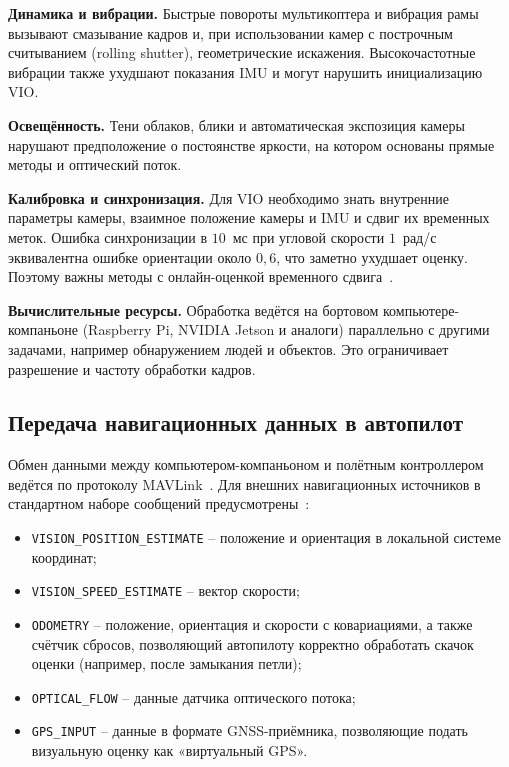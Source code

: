     \textbf{Динамика и вибрации.}
    Быстрые повороты мультикоптера и вибрация рамы вызывают смазывание кадров и, при использовании камер с построчным считыванием (rolling shutter), геометрические искажения.
    Высокочастотные вибрации также ухудшают показания IMU и могут нарушить инициализацию VIO.

    \textbf{Освещённость.}
    Тени облаков, блики и автоматическая экспозиция камеры нарушают предположение о постоянстве яркости, на котором основаны прямые методы и оптический поток.

    \textbf{Калибровка и синхронизация.}
    Для VIO необходимо знать внутренние параметры камеры, взаимное положение камеры и IMU и сдвиг их временных меток.
    Ошибка синхронизации в $10$~мс при угловой скорости $1$~рад/с эквивалентна ошибке ориентации около $0{,}6$\textdegree, что заметно ухудшает оценку.
    Поэтому важны методы с онлайн-оценкой временного сдвига~\cite{vins_td, openvins}.

    \textbf{Вычислительные ресурсы.}
    Обработка ведётся на бортовом компьютере-компаньоне (Raspberry Pi, NVIDIA Jetson и аналоги) параллельно с другими задачами, например обнаружением людей и объектов.
    Это ограничивает разрешение и частоту обработки кадров.

    \subsection{Передача навигационных данных в автопилот}

    Обмен данными между компьютером-компаньоном и полётным контроллером ведётся по протоколу MAVLink~\cite{mavlink_survey}.
    Для внешних навигационных источников в стандартном наборе сообщений предусмотрены~\cite{mavlink_common}:
    \begin{itemize}
        \item \texttt{VISION\_POSITION\_ESTIMATE} -- положение и ориентация в локальной системе координат;
        \item \texttt{VISION\_SPEED\_ESTIMATE} -- вектор скорости;
        \item \texttt{ODOMETRY} -- положение, ориентация и скорости с ковариациями, а также счётчик сбросов, позволяющий автопилоту корректно обработать скачок оценки (например, после замыкания петли);
        \item \texttt{OPTICAL\_FLOW} -- данные датчика оптического потока;
        \item \texttt{GPS\_INPUT} -- данные в формате GNSS-приёмника, позволяющие подать визуальную оценку как «виртуальный GPS».
    \end{itemize}


